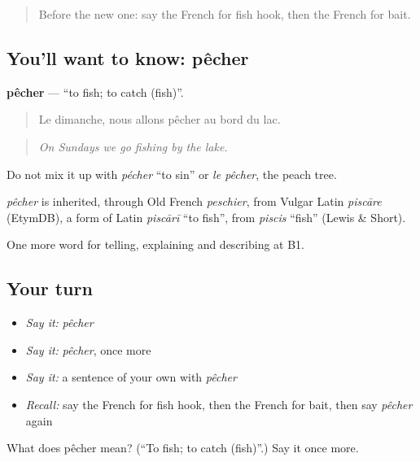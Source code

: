 \begin{quote}
Before the new one: say the French for fish hook, then the French for bait.
\end{quote}

\subsection*{You'll want to know: pêcher}
\textbf{pêcher} — \textquotedblleft{}to fish; to catch (fish)\textquotedblright{}.

\begin{quote}
Le dimanche, nous allons pêcher au bord du lac.
\end{quote}

\begin{quote}
\emph{On Sundays we go fishing by the lake.}
\end{quote}

Do not mix it up with \emph{pécher} \textquotedblleft{}to sin\textquotedblright{} or \emph{le pêcher}, the peach tree.

\begin{cousinweb}
\emph{pêcher} is inherited, through Old French \emph{peschier}, from Vulgar Latin \emph{piscāre} (EtymDB), a form of Latin \emph{piscārī} \textquotedblleft{}to fish\textquotedblright{}, from \emph{piscis} \textquotedblleft{}fish\textquotedblright{} (Lewis \& Short).
\end{cousinweb}

\begin{grammarlens}[title={What you've built}]
One more word for telling, explaining and describing at B1.
\end{grammarlens}

\subsection*{Your turn}
\begin{itemize}
\raggedright
  \item \emph{Say it:} \emph{pêcher}
  \item \emph{Say it:} \emph{pêcher}, once more
  \item \emph{Say it:} a sentence of your own with \emph{pêcher}
  \item \emph{Recall:} say the French for fish hook, then the French for bait, then say \emph{pêcher} again
\end{itemize}

\begin{tcolorbox}[breakable,colback=teal!4,colframe=teal!35!black,title={Before you move on}]
What does pêcher mean? (\textquotedblleft{}To fish; to catch (fish)\textquotedblright{}.) Say it once more.
\end{tcolorbox}
